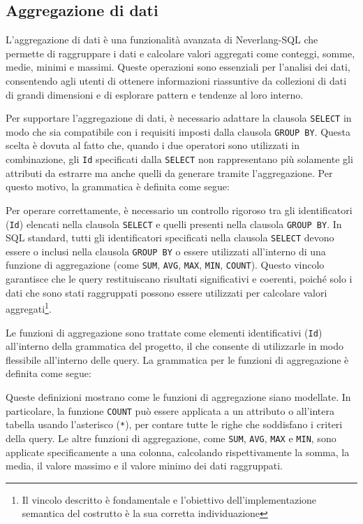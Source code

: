 \documentclass[12pt,a4paper,openright,twoside]{book}
\begin{document}
\subsection{Aggregazione di dati}
\label{section:aggregazione}
L’aggregazione di dati è una funzionalità avanzata di Neverlang-SQL che permette di raggruppare i dati e calcolare valori aggregati 
come conteggi, somme, medie, minimi e massimi. Queste operazioni sono essenziali per l’analisi dei dati, consentendo agli utenti di 
ottenere informazioni riassuntive da collezioni di dati di grandi dimensioni e di esplorare pattern e tendenze al loro interno.

Per supportare l’aggregazione di dati, è necessario adattare la clausola \texttt{SELECT} in modo che sia compatibile con i requisiti imposti 
dalla clausola \texttt{GROUP BY}. Questa scelta è dovuta al fatto che, quando i due operatori sono utilizzati in combinazione, gli 
\texttt{Id} specificati dalla \texttt{SELECT} non rappresentano più solamente gli attributi da estrarre ma anche quelli da generare tramite 
l’aggregazione. Per questo motivo, la grammatica è definita come segue:


Per operare correttamente, è necessario un controllo rigoroso tra gli identificatori (\texttt{Id}) elencati nella clausola 
\texttt{SELECT} e quelli presenti nella clausola \texttt{GROUP BY}. In SQL standard, tutti gli identificatori specificati nella 
clausola \texttt{SELECT} devono essere o inclusi nella clausola \texttt{GROUP BY} o essere utilizzati all’interno di una funzione 
di aggregazione (come \texttt{SUM}, \texttt{AVG}, \texttt{MAX}, \texttt{MIN}, \texttt{COUNT}). Questo vincolo garantisce che le 
query restituiscano risultati significativi e coerenti, poiché solo i dati che sono stati raggruppati possono essere utilizzati 
per calcolare valori aggregati\footnote{Il vincolo descritto è fondamentale e l’obiettivo dell’implementazione semantica del 
costrutto è la sua corretta individuazione}.

Le funzioni di aggregazione sono trattate come elementi identificativi (\texttt{Id}) all’interno della grammatica del progetto, il 
che consente di utilizzarle in modo flessibile all’interno delle query. La grammatica per le funzioni di aggregazione è definita 
come segue:


Queste definizioni mostrano come le funzioni di aggregazione siano modellate. In particolare, la funzione \texttt{COUNT} può essere 
applicata a un attributo o all’intera tabella usando l’asterisco (\texttt{*}), per contare tutte le righe che soddisfano i criteri 
della query. Le altre funzioni di aggregazione, come \texttt{SUM}, \texttt{AVG}, \texttt{MAX} e \texttt{MIN}, sono applicate 
specificamente a una colonna, calcolando rispettivamente la somma, la media, il valore massimo e il valore minimo dei dati 
raggruppati.
\end{document}
